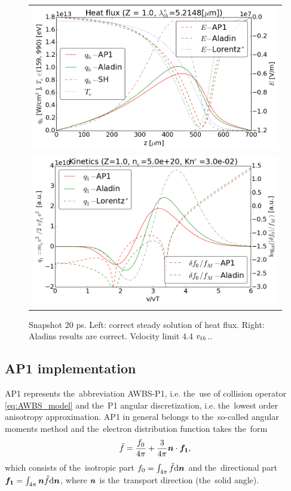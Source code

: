 \begin{figure}[tbh]
  \begin{center}
    \begin{tabular}{c}
      \includegraphics[width=\figscale\textwidth]{../VFPdata/C7_Aladin_case5_heatflux.png} \\
      \includegraphics[width=\figscale\textwidth]{../VFPdata/C7_Aladin_case5_kinetics.png}
    \end{tabular}
  \caption{  
  Snapshot 20 ps. Left: correct steady solution of heat flux. 
  Right: Aladins results are correct. Velocity limit 4.4 $v_{th}$..
  }
  \label{fig:C7_Aladin_case5}
  \end{center} 
\end{figure}

\subsection{AP1 implementation}
\label{sec:C7code}

AP1 represents the~abbreviation AWBS-P1, i.e. the~use of collision operator 
\eqref{eq:AWBS_model} and the~P1 angular discretization, i.e. the~lowest order 
anisotropy approximation. AP1 in general belongs to the~so-called angular 
moments method and the~electron distribution function takes the~form
\begin{equation}
  \tilde{f} = \frac{f_0}{4\pi} + \frac{3}{4\pi}\boldsymbol{n}\cdot\boldsymbol{f_1} , 
  \nonumber \label{eq:P1approximation}
\end{equation}
which consists of the~isotropic part $f_0 = \int_{4\pi} \tilde{f} \text{d}\boldsymbol{n}$ 
and the~directional part $\boldsymbol{f_1} = \int_{4\pi} \boldsymbol{n}
\tilde{f} \text{d}\boldsymbol{n}$, where $\boldsymbol{n}$ is the~transport direction (the~solid angle).

